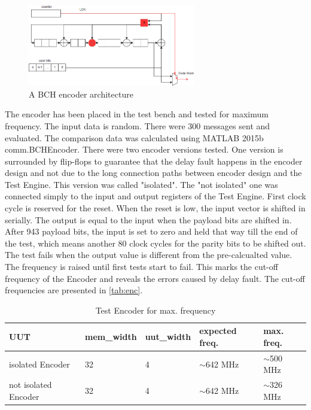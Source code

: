 \begin{figure}[h]
\centering
\includegraphics[width=0.65\textwidth]{figures/BCH_ENC.png}
\caption{A BCH encoder architecture \cite{art:BCH_implement}}
\label{fig:enc_0}
\end{figure}

The encoder has been placed in the test bench and tested for maximum frequency. The input data is random. There were 300 messages sent and evaluated. The comparison data was calculated using MATLAB 2015b comm.BCHEncoder. There were two encoder versions tested. One version is surrounded by flip-flops to guarantee that the delay fault happens in the encoder design and not due to the long connection paths between encoder design and the Test Engine. This version was called "isolated". The "not isolated" one was connected simply to the input and output registers of the Test Engine. First clock cycle is reserved for the reset. When the reset is low, the input vector is shifted in serially. The output is equal to the input when the payload bits are shifted in. After 943 payload bits, the input is set to zero and held that way till the end of the test, which means another 80 clock cycles for the parity bits to be shifted out. The test fails when the output value is different from the pre-calcualted value. The frequency is raised until first tests start to fail. This marks the cut-off frequency of the Encoder and reveals the errors caused by delay fault. The cut-off frequencies are presented in \autoref{tab:enc}.

\begin{table}[h]
\begin{tabular}{@{}lllll@{}}
\toprule
UUT                       &mem\_width   &uut\_width &expected freq. &max. freq.\\ 
\midrule
isolated Encoder                  & 32          & 4      & $\sim$642 MHz & $\sim$500 MHz \\
not isolated Encoder              & 32          & 4      & $\sim$642 MHz & $\sim$326 MHz \\
\bottomrule
\end{tabular}
\centering
\caption{Test Encoder for max. frequency}\label{tab:enc}
\end{table}


